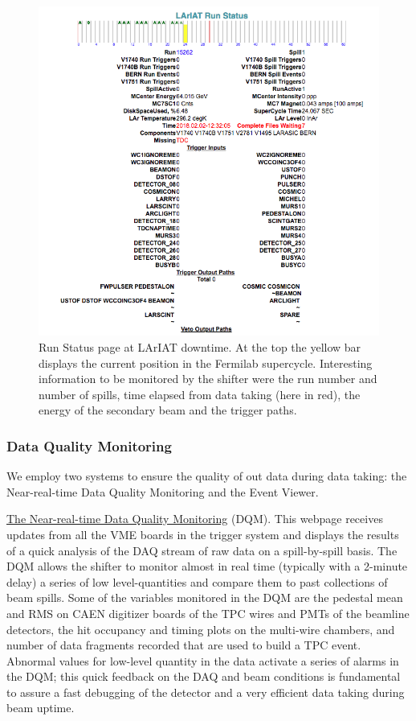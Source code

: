 \begin{figure}[htb]
\centering
\includegraphics[scale=0.6]{Chapter-3/Images/RunConditions.png}
\caption{Run Status page at LArIAT downtime. At the top the yellow bar displays the current position in the Fermilab supercycle. Interesting information to be monitored by the shifter were the run number and number of spills, time elapsed from data taking (here in red), the energy of the secondary beam and the trigger paths.}
\label{fig:runcond}
\end{figure}



\subsubsection{Data Quality Monitoring}
We employ two systems to ensure the quality of out data during data taking: the Near-real-time Data Quality Monitoring and the Event Viewer.

\href{http://lariat-daq01.fnal.gov:5000/}{The Near-real-time Data Quality Monitoring} (DQM). This webpage receives updates from all the VME boards in the trigger system and displays the results of a quick analysis of the DAQ stream of raw data on a spill-by-spill basis. The DQM allows the shifter to monitor almost in real time (typically with a 2-minute delay)  a series of low level-quantities and compare them to past collections of beam spills. Some of the variables monitored in the DQM are  the pedestal mean and RMS on CAEN digitizer boards
of the TPC wires and PMTs of the beamline detectors, the hit occupancy and timing plots on the multi-wire chambers, and number of data fragments recorded that are used to build a TPC event. Abnormal values for  low-level quantity in the data  activate a series of alarms in the DQM; this quick feedback on the DAQ and beam conditions is fundamental to assure a fast debugging of the detector and a very efficient data taking during beam uptime.

